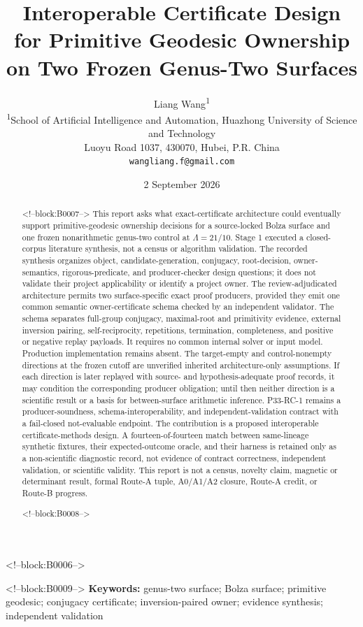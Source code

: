 \documentclass[11pt,a4paper]{article}
\title{Interoperable Certificate Design for Primitive Geodesic Ownership on Two Frozen Genus-Two Surfaces}
\author{Liang Wang\textsuperscript{1}\\
\small \textsuperscript{1}School of Artificial Intelligence and Automation, Huazhong University of Science and Technology\\
\small Luoyu Road 1037, 430070, Hubei, P.R. China\\
\small \texttt{wangliang.f@gmail.com}}
\date{2 September 2026}
\begin{document}
\maketitle

<!--block:B0006-->
\begin{abstract}

<!--block:B0007-->
This report asks what exact-certificate architecture could eventually support primitive-geodesic ownership decisions for a source-locked Bolza surface and one frozen nonarithmetic genus-two control at \(\Lambda=21/10\). Stage 1 executed a closed-corpus literature synthesis, not a census or algorithm validation. The recorded synthesis organizes object, candidate-generation, conjugacy, root-decision, owner-semantics, rigorous-predicate, and producer-checker design questions; it does not validate their project applicability or identify a project owner. The review-adjudicated architecture permits two surface-specific exact proof producers, provided they emit one common semantic owner-certificate schema checked by an independent validator. The schema separates full-group conjugacy, maximal-root and primitivity evidence, external inversion pairing, self-reciprocity, repetitions, termination, completeness, and positive or negative replay payloads. It requires no common internal solver or input model. Production implementation remains absent. The target-empty and control-nonempty directions at the frozen cutoff are unverified inherited architecture-only assumptions. If each direction is later replayed with source- and hypothesis-adequate proof records, it may condition the corresponding producer obligation; until then neither direction is a scientific result or a basis for between-surface arithmetic inference. P33-RC-1 remains a producer-soundness, schema-interoperability, and independent-validation contract with a fail-closed not-evaluable endpoint. The contribution is a proposed interoperable certificate-methods design. A fourteen-of-fourteen match between same-lineage synthetic fixtures, their expected-outcome oracle, and their harness is retained only as a non-scientific diagnostic record, not evidence of contract correctness, independent validation, or scientific validity. This report is not a census, novelty claim, magnetic or determinant result, formal Route-A tuple, A0/A1/A2 closure, Route-A credit, or Route-B progress.

<!--block:B0008-->
\end{abstract}

<!--block:B0009-->
\noindent\textbf{Keywords:} genus-two surface; Bolza surface; primitive geodesic; conjugacy certificate; inversion-paired owner; evidence synthesis; independent validation
\end{document}
